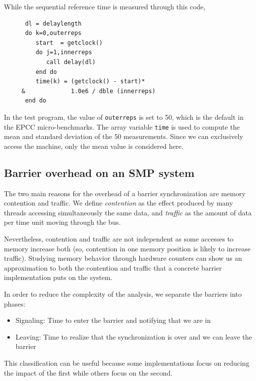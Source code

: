 While the sequential reference time is measured through this code,

{\small
\begin{verbatim}
      dl = delaylength 
      do k=0,outerreps
         start  = getclock()
         do j=1,innerreps
            call delay(dl)
         end do
         time(k) = (getclock() - start)*
     &             1.0e6 / dble (innerreps) 
      end do
\end{verbatim}
}

In the test program, the value of \texttt{outerreps} is set to 50,
which is the default in the EPCC micro-benchmarks. The array variable
\texttt{time} is used to compute the mean and standard deviation of
the 50 measurements. Since we can exclusively access the machine, only
the mean value is considered here.

\subsection{Barrier overhead on an SMP system}

The two main reasons for the overhead of a barrier synchronization are
memory contention and traffic.  We define \emph{contention} as the effect
produced by many threads accessing simultaneously the same data, and
\emph{traffic} as the amount of data per time unit moving through the
bus. 

Nevertheless, contention and traffic are not independent as some
accesses to memory increase both (so, contention in one memory
position is likely to increase traffic).  Studying memory behavior
through hardware counters can show us an approximation to both the
contention and traffic that a concrete barrier implementation puts on
the system.

In order to reduce the complexity of the analysis, we separate the
barriers into phases:

\begin{itemize}
\item Signaling: Time to enter the barrier and notifying that we are
  in
\item Leaving: Time to realize that the synchronization is over and we
  can leave the barrier
\end{itemize}
This classification can be useful because some implementations focus on 
reducing the impact of the first while others focus on the second. 





